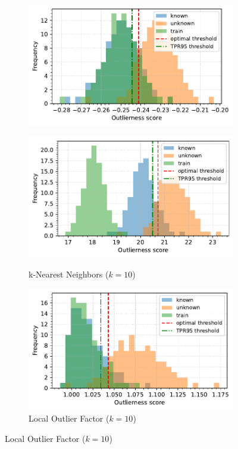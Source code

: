 \begin{figure}[t]
\begin{subfigure}[b]{0.495\textwidth}
        \includegraphics[width=\textwidth]{images/distributions/histograms/hist-distributions-dimension_250-samples_1000-distance_8-distribution_gaussian-model_IRWD-1000-seed_0.pdf}
        \label{fig:histogram-irwd}
    \end{subfigure}
    \hfill
    \begin{subfigure}[b]{0.495\textwidth}
        \centering
        \caption{\small k-Nearest Neighbors ($k=10$)}
        \includegraphics[width=\textwidth]{images/distributions/histograms/hist-distributions-dimension_250-samples_1000-distance_8-distribution_gaussian-model_kNN-10-seed_0.pdf}
        \label{fig:histogram-knn}
    \end{subfigure}
    \begin{subfigure}[b]{0.495\textwidth}
        \centering
        \caption{\small Local Outlier Factor ($k=10$)}
        \includegraphics[width=\textwidth]{images/distributions/histograms/hist-distributions-dimension_250-samples_1000-distance_8-distribution_gaussian-model_LOF-10-seed_0.pdf}

\end{subfigure}
\end{figure}
